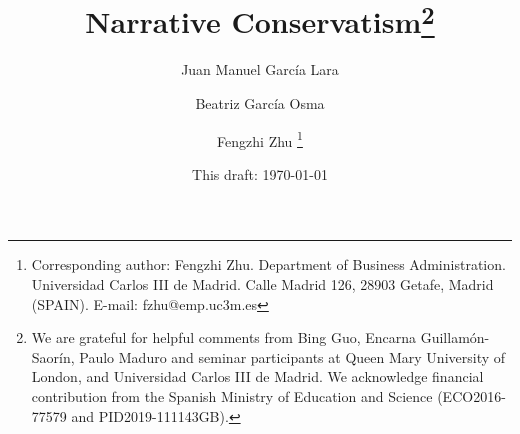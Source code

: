 \documentclass[letterpaper,12pt]{article}
\begin{document}
	
	\title{\textbf{Narrative Conservatism}\footnote{We are grateful for helpful comments from Bing Guo, Encarna Guillam\'on-Saor\'in, Paulo Maduro and seminar participants at Queen Mary University of London, and Universidad Carlos III de Madrid. We acknowledge financial contribution from the Spanish Ministry of Education and Science (ECO2016-77579 and PID2019-111143GB).}}
		
	\author{\normalsize \vspace{1cm}Juan Manuel Garc\'ia Lara}
	
	\author{Beatriz Garc\'ia Osma}
	
	\author{Fengzhi Zhu%
		\thanks{Corresponding author: Fengzhi Zhu. Department of Business Administration. Universidad Carlos III de Madrid. Calle Madrid 126, 28903 Getafe, Madrid (SPAIN). E-mail: fzhu@emp.uc3m.es}}
	
	
	\date{\small This draft: \today}
	
	\maketitle
	
\end{document}
